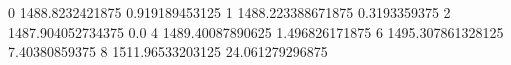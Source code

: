 0 1488.8232421875 0.919189453125
1 1488.223388671875 0.3193359375
2 1487.904052734375 0.0
4 1489.40087890625 1.496826171875
6 1495.307861328125 7.40380859375
8 1511.96533203125 24.061279296875
